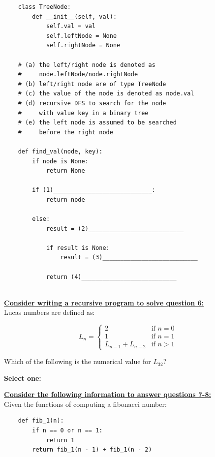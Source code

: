 \documentclass[11pt,addpoints,answers]{exam}
\numberwithin{equation}{section} %
\numberwithin{figure}{section} %
\numberwithin{table}{section} %
\begin{document}
\begin{questions}
    \begin{lstlisting}
    class TreeNode:
        def __init__(self, val):
            self.val = val
            self.leftNode = None
            self.rightNode = None
        
    # (a) the left/right node is denoted as
    #     node.leftNode/node.rightNode
    # (b) left/right node are of type TreeNode
    # (c) the value of the node is denoted as node.val
    # (d) recursive DFS to search for the node 
    #     with value key in a binary tree
    # (e) the left node is assumed to be searched 
    #     before the right node
        
    def find_val(node, key):
        if node is None:
            return None
            
        if (1)____________________________:
            return node
            
        else:
            result = (2)___________________________
            
            if result is None:
                result = (3)___________________________
                
            return (4)___________________________
                
    \end{lstlisting}
    
    \clearpage
    \textbf{\underline{Consider writing a recursive program to solve question 6:}} \\
    Lucas numbers are defined as:
    
    \[ L_n = \begin{cases} 
          2 & \text{if } n = 0\\
          1 & \text{if } n = 1\\
          L_{n-1} + L_{n-2} & \text{if } n > 1
       \end{cases}
    \]
    
    \question[2] Which of the following is the numerical value for $L_{32}$? 

    \textbf{Select one:}
    \begin{checkboxes}
    \end{checkboxes}

    
    \newpage
    \textbf{\underline{Consider the following information to answer questions 7-8:}} \\
    Given the functions of computing a fibonacci number:
    \begin{lstlisting}
    def fib_1(n):
        if n == 0 or n == 1:
            return 1
        return fib_1(n - 1) + fib_1(n - 2)
        

\end{lstlisting}
\end{questions}
\end{document}
